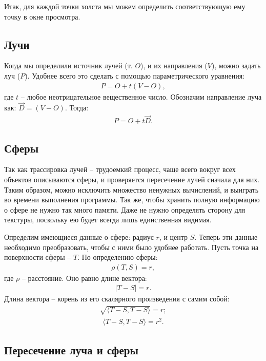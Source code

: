 Итак, для каждой точки холста мы можем определить соответствующую ему точку в окне просмотра.

\subsection{Лучи}

Когда мы определили источник лучей (т. $O$), и их направления ($V$), можно задать луч ($P$). Удобнее всего это сделать с помощью параметрического уравнения:
\begin{gather}
	P = O+t(V-O),
\end{gather}
где $t$ – любое неотрицательное вещественное число. Обозначим направление луча как: $\vec{D}=(V-O)$. Тогда:
\begin{gather}
	P = O+t\vec{D}.
\end{gather}

\subsection{Сферы}

Так как трассировка лучей – трудоемкий процесс, чаще всего вокруг всех
объектов описываются сферы, и проверяется пересечение лучей сначала для них. Таким образом, можно исключить множество ненужных вычислений, и выиграть во времени выполнения программы. Так же, чтобы хранить полную информацию о сфере не нужно так много памяти. Даже не нужно определять сторону для текстуры, поскольку ею будет всегда лишь единственная видимая.

Определим имеющиеся данные о сфере: радиус $r$, и центр $S$. Теперь эти данные необходимо преобразовать, чтобы с ними было удобнее работать.
Пусть точка на поверхности сферы -- $T$. По определению сферы:
\begin{gather}
	\rho(T, S) = r,
\end{gather}
где $\rho$ – расстояние. Оно равно длине вектора:
\begin{gather}
	|T-S| = r.
\end{gather}
Длина вектора – корень из его скалярного произведения с самим собой:
\begin{gather}
	\sqrt{\langle T-S, T-S \rangle} = r;
\end{gather}
\begin{gather}
	\langle T-S, T-S \rangle = r^2.
\end{gather}

\subsection{Пересечение луча и сферы}

